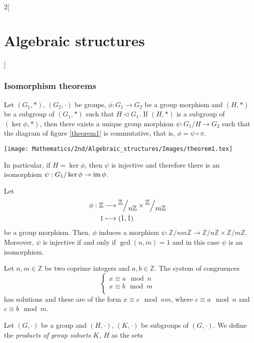 \documentclass[class=article,10pt,crop=false]{standalone}
\begin{document}
\begin{multicols}{2}[\section{Algebraic structures}]
\subsubsection*{Isomorphism theorems}
\begin{theorem}
Let $(G_1,*)$, $(G_2,\cdot)$ be groups, $\phi:G_1\rightarrow G_2$ be a group morphism and $(H,*)$ be a subgroup of $(G_1,*)$ such that $H\lhd G_1$. If $(H,*)$ is a subgroup of $(\ker\phi,*)$, then there exists a unique group morphism $\psi:G_1/H\rightarrow G_2$ such that the diagram of figure \ref{theorem1} is commutative, that is, $\phi=\psi\circ\pi$.\par
\begin{minipage}{\linewidth}
    \centering
    \texttt{[image: Mathematics/2nd/Algebraic\_structures/Images/theorem1.tex]} 
    \label{theorem1}
\end{minipage}\par
In particular, if $H=\ker\phi$, then $\psi$ is injective and therefore there is an isomorphism $\psi:G_1/\ker\phi\rightarrow\operatorname{im}\phi$.
\end{theorem}
\begin{theorem}
Let 
\begin{align*}
    \phi:\mathbb{Z}&\longrightarrow\quot{\mathbb{Z}}{n\mathbb{Z}}\times\quot{\mathbb{Z}}{m\mathbb{Z}}\\
    1&\longmapsto(\Bar{1},\Bar{1})
\end{align*}
be a group morphism. Then, $\phi$ induces a morphism $\psi:\mathbb{Z}/nm\mathbb{Z}\rightarrow\mathbb{Z}/n\mathbb{Z}\times\mathbb{Z}/m\mathbb{Z}$. Moreover, $\psi$ is injective if and only if $\gcd(n,m)=1$ and in this case $\psi$ is an isomorphism. 
\end{theorem}
\begin{corollary}
Let $n,m\in\mathbb{Z}$ be two coprime integers and $a,b\in\mathbb{Z}$. The system of congruences $$\left\{\begin{array}{l}
    x\equiv a\mod{n}  \\
    x\equiv b\mod{m}  \\
\end{array}\right.$$ has solutions and these are of the form $x\equiv c\mod{nm}$, where $c\equiv a\mod{n}$ and $c\equiv b\mod{m}$.
\end{corollary}
\begin{definition}
Let $(G,\cdot)$ be a group and $(H,\cdot)$, $(K,\cdot)$ be subgroups of $(G,\cdot)$. We define the \textit{products of group subsets $K$, $H$} as the sets \begin{gather*}

\end{gather*}
\end{definition}
\end{multicols}
\end{document}
